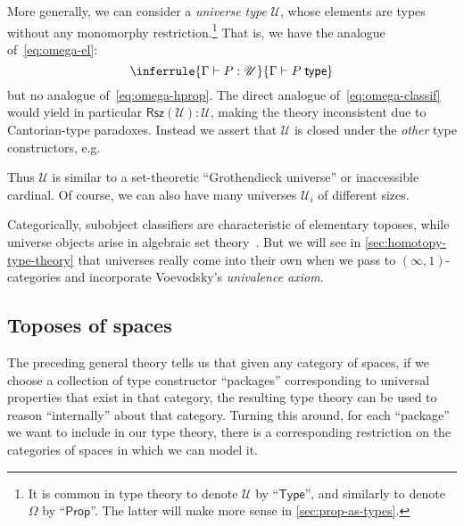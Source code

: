 \documentclass[12pt]{article}
\def\oo{\ensuremath{\infty}}
\def\io{\ensuremath{(\oo,1)}}
\def\ty{\;\mathsf{type}}
\def\tprod{\textstyle\prod}
\def\tsm{\textstyle\sum}
\def\types{\vdash}
\def\U{\mathscr{U}}
\numberwithin{equation}{section}
\begin{document}
More generally, we can consider a \emph{universe type} $\U$, whose elements are types without any monomorphy restriction.\footnote{It is common in type theory to denote $\U$ by ``$\mathsf{Type}$'', and similarly to denote $\Omega$ by ``$\mathsf{Prop}$''.
  The latter will make more sense in \cref{sec:prop-as-types}.}
That is, we have the analogue of~\eqref{eq:omega-el}:
\[ \inferrule{\Gamma \types P:\U}{\Gamma \types P\ty} \]
but no analogue of~\eqref{eq:omega-hprop}.
The direct analogue of~\eqref{eq:omega-classif} would yield in particular $\mathsf{Rsz}(\U):\U$,
making the theory inconsistent due to Cantorian-type paradoxes.
Instead we assert that $\U$ is closed under the \emph{other} type constructors, e.g.
Thus $\U$ is similar to a set-theoretic ``Grothendieck universe'' or inaccessible cardinal.
Of course, we can also have many universes $\U_i$ of different sizes.

Categorically, subobject classifiers are characteristic of elementary toposes, while universe objects arise in algebraic set theory~\cite{jm:ast,ast-website}.
But we will see in \cref{sec:homotopy-type-theory} that universes really come into their own when we pass to \io-categories and incorporate Voevodsky's \emph{univalence axiom}.


\subsection{Toposes of spaces}
\label{sec:toposes-spaces}

The preceding general theory tells us that given any category of spaces, if we choose a collection of type constructor ``packages'' corresponding to universal properties that exist in that category, the resulting type theory can be used to reason ``internally'' about that category.
Turning this around, for each ``package'' we want to include in our type theory, there is a corresponding restriction on the categories of spaces in which we can model it. %
\end{document}
